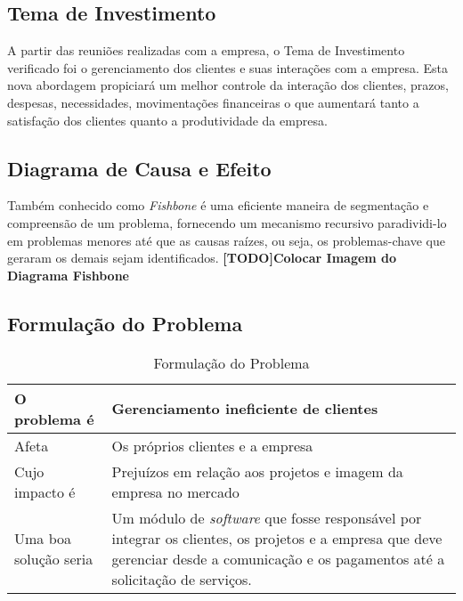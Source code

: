     \subsection{Tema de Investimento}
      A partir das reuniões realizadas com a empresa, o Tema de Investimento verificado foi o gerenciamento dos clientes e suas interações com a empresa. Esta nova abordagem propiciará um melhor controle da interação dos clientes, prazos, despesas, necessidades, movimentações financeiras o que aumentará tanto a satisfação dos clientes quanto a produtividade da empresa.


    \subsection{Diagrama de Causa e Efeito}
      Também conhecido como \textit{Fishbone} é uma eficiente maneira de segmentação e compreensão de um problema, fornecendo um mecanismo recursivo paradividi-lo em problemas menores até que as causas raízes, ou seja, os problemas-chave que geraram os demais sejam identificados.
    \textbf{[TODO]Colocar Imagem do Diagrama Fishbone}


    \subsection{Formulação do Problema}

      
      \begin{table}[!htbp]
        \centering
        \caption{Formulação do Problema}
        \label{Formulação Do Problema}
        \begin{tabularx}{0.9\textwidth}{|>{}s |b|}
          \hline
            O problema é           & Gerenciamento ineficiente de clientes                               \\ \hline
            Afeta                  & Os próprios clientes e a empresa                                    \\ \hline
            Cujo impacto é         & Prejuízos em relação aos projetos e imagem da empresa no mercado    \\ \hline
            Uma boa solução seria  & Um módulo de \textit{software} que fosse responsável por integrar os clientes, os projetos e a empresa que deve gerenciar desde a comunicação e os pagamentos até a solicitação de serviços.                                                                        \\ \hline
        \end{tabularx}
      \end{table}
     


